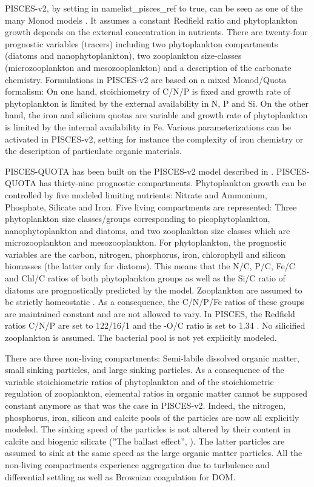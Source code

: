 \documentclass[../main/TOP_manual]{subfiles}
\begin{document}
PISCES-v2, by setting in namelist\_pisces\_ref   to true,  can be seen as one of the many Monod models \citep{monod_1958}. It assumes a constant Redfield ratio and phytoplankton growth depends on the external concentration in nutrients. There are twenty-four prognostic variables (tracers) including two phytoplankton compartments  (diatoms and nanophytoplankton), two zooplankton size-classes (microzooplankton and  mesozooplankton) and a description of the carbonate chemistry. Formulations in PISCES-v2 are based on a mixed Monod/Quota formalism: On one hand, stoichiometry of C/N/P is fixed and growth rate of phytoplankton is limited by the external availability in N, P and Si. On the other hand, the iron and silicium quotas are variable and growth rate of phytoplankton is limited by the internal availability in Fe. Various parameterizations can be activated in PISCES-v2, setting for instance the complexity of iron chemistry or the description of particulate organic materials.

PISCES-QUOTA has been built on the PISCES-v2 model described in \citet{aumont_2015}. PISCES-QUOTA has thirty-nine prognostic compartments. Phytoplankton growth can be controlled by five modeled limiting nutrients: Nitrate and Ammonium, Phosphate, Silicate and Iron. Five living compartments are represented: Three phytoplankton size classes/groups corresponding to picophytoplankton, nanophytoplankton and diatoms, and two zooplankton size classes which are microzooplankton and mesozooplankton. For phytoplankton, the prognostic variables are the carbon, nitrogen, phosphorus,  iron, chlorophyll and silicon biomasses (the latter only for diatoms). This means that the N/C, P/C, Fe/C and Chl/C ratios of both phytoplankton groups as well as the Si/C ratio of diatoms are prognostically predicted  by the model. Zooplankton are assumed to be strictly homeostatic \citep[e.g.,][]{sterner_2003,woods_2013,meunier_2014}. As a consequence, the C/N/P/Fe ratios of these groups are maintained constant and are not allowed to vary. In PISCES, the Redfield ratios C/N/P are set to 122/16/1 \citep{takahashi_1985} and the -O/C ratio is set to 1.34 \citep{kortzinger_2001}. No silicified zooplankton is assumed. The bacterial pool is not yet explicitly modeled.

There are three non-living compartments: Semi-labile dissolved organic matter, small sinking particles, and large sinking particles. As a consequence of the variable stoichiometric ratios of phytoplankton and of the stoichiometric regulation of zooplankton, elemental ratios in organic matter cannot be supposed constant anymore as that was the case in PISCES-v2. Indeed, the nitrogen, phosphorus, iron, silicon and calcite pools of the particles are now all explicitly modeled. The sinking speed of the particles is not altered by their content in calcite and biogenic silicate (''The ballast effect'', \citep{honjo_1996,armstrong_2001}). The latter particles are assumed to sink at the same speed as the large organic matter particles. All the non-living compartments experience aggregation due to turbulence and differential settling as well as Brownian coagulation for DOM.
\end{document}
